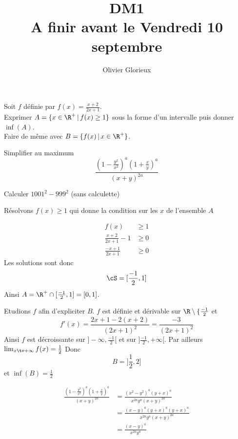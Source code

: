 \documentclass[a4paper, 11pt,reqno]{article}
\author{Olivier Glorieux}
\begin{document}
\title{DM1 \\
\small{A finir avant le Vendredi 10 septembre} 
}
\begin{exercice}
Soit $f$ définie par $f(x) = \frac{x+2}{2x+1}$.\\
Exprimer $A=\{ x\in \R^+\,| \, f(x) \geq 1\}$ sous la forme d'un intervalle puis donner $\inf(A)$. \\
Faire de même avec $B=\{ f(x)\,| \, x \in\R^+\}$.

\end{exercice}


\begin{exercice}
Simplifier au maximum
$$\frac{\left(1-\frac{y^2}{x^2}\right)^a\left(1+\frac{x}{y}\right)^a }{(x+y)^{2a}}$$
\end{exercice}


\begin{exercice}
Calculer $1001^2-999^2$ (sans calculette)
\end{exercice}



\begin{correction}
Résolvons $f(x) \geq 1$ qui donne la condition sur les $x$ de l'ensemble $A$

\begin{align*}
f(x) &\geq 1 \\
\frac{x+2}{2x+1}-1 &\geq 0\\
\frac{-x+1}{2x+1} &\geq 0
\end{align*}
Les solutions sont donc 
$$\cS = [\frac{-1}{2}, 1]$$
Ainsi $A=\R^+\cap  [\frac{-1}{2}, 1] = [0,1]$.

Etudions $f$ afin d'expliciter $B$. 
$f$ est définie et  dérivable  sur $\R\setminus\{ \frac{-1}{2}$ et 
$$f'(x) = \frac{2x+1 - 2(x+2)}{(2x+1)^2}= \frac{-3}{(2x+1)^2}$$
Ainsi $f$ est décroissante sur $]-\infty, \frac{-1}{2}[ $ et sur $]\frac{-1}{2}, +\infty[$. 
Par ailleurs $\lim_{x\tv +\infty } f(x) = \frac{1}{2}$
Donc 
$$B= ]\frac{1}{2},2]$$ et 
$\inf(B) = \frac{1}{2}$


\end{correction}



\begin{correction}
\begin{align*}
\frac{\left(1-\frac{y^2}{x^2}\right)^a\left(1+\frac{x}{y}\right)^a }{(x+y)^{2a}} &=\frac{\left(x^2-y^2\right)^a\left(y+x\right)^a }{x^{2a}y^a(x+y)^{2a}}\\
&=\frac{\left(x-y\right)^a\left(y+x\right)^a\left(y+x\right)^a }{x^{2a}y^a(x+y)^{2a}}\\
&=\frac{\left(x-y\right)^a }{x^{2a}y^a}
\end{align*}

\end{correction}
\end{document}
